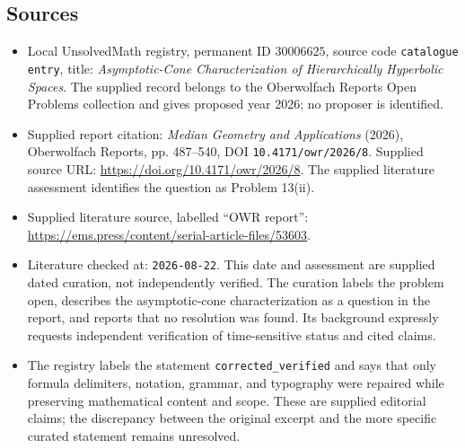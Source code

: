 \documentclass[11pt]{article}
\begin{document}
\subsection{Sources}
\begin{itemize}
\item Local UnsolvedMath registry, permanent ID \(30006625\), source code \texttt{catalogue entry}, title: \emph{Asymptotic-Cone Characterization of Hierarchically Hyperbolic Spaces}. The supplied record belongs to the Oberwolfach Reports Open Problems collection and gives proposed year 2026; no proposer is identified.
\item Supplied report citation: \emph{Median Geometry and Applications} (2026), Oberwolfach Reports, pp. 487--540, DOI \texttt{10.4171/owr/2026/8}. Supplied source URL: \url{https://doi.org/10.4171/owr/2026/8}. The supplied literature assessment identifies the question as Problem 13(ii).
\item Supplied literature source, labelled ``OWR report'': \url{https://ems.press/content/serial-article-files/53603}.
\item Literature checked at: \texttt{2026-08-22}. This date and assessment are supplied dated curation, not independently verified. The curation labels the problem open, describes the asymptotic-cone characterization as a question in the report, and reports that no resolution was found. Its background expressly requests independent verification of time-sensitive status and cited claims.
\item The registry labels the statement \texttt{corrected\_verified} and says that only formula delimiters, notation, grammar, and typography were repaired while preserving mathematical content and scope. These are supplied editorial claims; the discrepancy between the original excerpt and the more specific curated statement remains unresolved.
\end{itemize}
\end{document}
